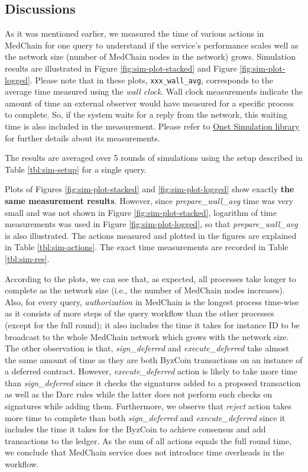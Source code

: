\subsection{Discussions}

As it was mentioned earlier, we measured the time of various actions in MedChain for one query to understand if the service's performance scales well as the network size (number of MedChain nodes in the network) grows. Simulation results are illustrated in Figure \ref{fig:sim-plot-stacked} and Figure \ref{fig:sim-plot-logged}. Please note that in these plots, \texttt{xxx\_wall\_avg}, corresponds to the average time measured using the \textit{wall clock}. Wall clock measurements indicate the amount of time an external observer would have measured for a specific process to complete. So, if the system waits for a reply from the network, this waiting time is also included in the measurement. Please refer to \href{https://github.com/dedis/onet/tree/simul_docu/simul}{Onet Simulation library} for further details about its measurements. 

The results are averaged over 5 rounds of simulations using the setup described in Table \ref{tbl:sim-setup} for a single query.

Plots of Figures \ref{fig:sim-plot-stacked} and \ref{fig:sim-plot-logged} show exactly \textbf{the same measurement results}. However, since \textit{prepare\_wall\_avg} time was very small and was not shown in Figure \ref{fig:sim-plot-stacked}, logarithm of time measurements was used in Figure \ref{fig:sim-plot-logged}, so that \textit{prepare\_wall\_avg} is also illustrated. The actions measured and plotted in the figures are explained in Table \ref{tbl:sim-actions}. The exact time measurements are recorded in Table \ref{tbl:sim-res}.

According to the plots, we can see that, as expected, all processes take longer to complete as the network size (i.e., the number of MedChain nodes increases). Also, for every query, \textit{authorization} in MedChain is the longest process time-wise as it consists of more steps of the query workflow than the other processes (except for the full round); it also includes the time it takes for instance ID to be broadcast to the whole MedChain network which grows with the network size. The other observation is that, \textit{sign\_deferred} and \textit{execute\_deferred} take almost the same amount of time as they are both ByzCoin transactions on an instance of a deferred contract. However, \textit{execute\_deferred} action is likely to take more time than \textit{sign\_deferred} since it checks the signatures added to a proposed transaction as well as the Darc rules while the latter does not perform such checks on signatures while adding them. Furthermore, we observe that \textit{reject} action takes more time to complete than both \textit{sign\_deferred} and \textit{execute\_deferred} since it includes the time it takes for the ByzCoin to achieve consensus and add transactions to the ledger. As the sum of all actions equals the full round time, we conclude that MedChain service does not introduce time overheads in the workflow. 

